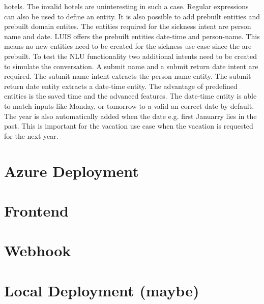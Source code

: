 hotels.
The invalid hotels are uninteresting in such a case.
Regular expressions\cite{regex} can also be used to define an entity.
It is also possible to add prebuilt entities and prebuilt domain entites.
The entities required for the sickness intent are person name and date. 
LUIS offers the prebuilt entities date-time and person-name.
This means no new entities need to be created for the sickness use-case
since the are prebuilt.
To test the NLU functionality two additional intents need to be created to 
simulate the conversation.
A submit name and a submit return date intent are required.
The submit name intent extracts the person name entity.
The submit return date entity extracts a date-time entity.
The advantage of predefined entities is the saved time and the 
advanced features.
The date-time entity is able to match inputs like Monday, or tomorrow to 
a valid an correct date by default.
The year is also automatically added when the date e.g. first Januarry lies in the past.
This is important for the vacation use case when the vacation is requested for 
the next year. 





\section{Azure Deployment}
\section{Frontend}
\section{Webhook}
\section{Local Deployment (maybe)}